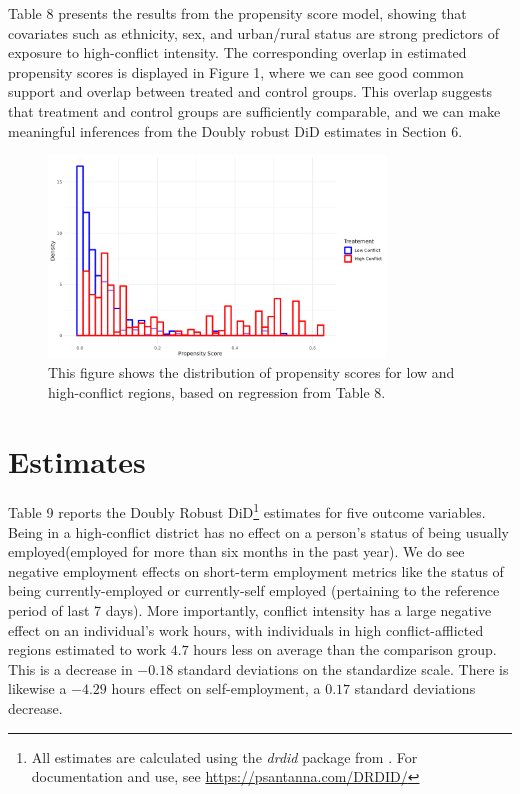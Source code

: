\documentclass[12pt,a4paper]{article}
\begin{document}
Table 8 presents the results from the propensity score model, showing that covariates such as ethnicity, sex, and urban/rural status are strong predictors of exposure to high-conflict intensity. The corresponding overlap in estimated propensity scores is displayed in Figure 1, where we can see good common support and overlap between treated and control groups. This overlap suggests that treatment and control groups are sufficiently comparable, and we can make meaningful inferences from the Doubly robust DiD estimates in Section 6.



\begin{figure}[H]
\centering
\includegraphics[width=0.8\textwidth]{../Analysis files/ps_overlap.jpg}
\caption{This figure shows the distribution of propensity scores for low and high-conflict regions, based on regression from Table 8.}
\label{fig:ps_overlap}
\end{figure}




\section{Estimates}

Table 9 reports the Doubly Robust DiD\footnote{All estimates are calculated using the \textit{drdid} package from \textcite{sant2020doubly}. For documentation and use, see \url{https://psantanna.com/DRDID/}} estimates for five outcome variables.
Being in a high-conflict district has no effect on a person's status of being usually employed(employed for more than six months in the past year). We do see negative employment effects on short-term employment metrics like the status of being currently-employed or currently-self employed (pertaining to the reference period of last 7 days). More importantly, conflict intensity has a large
negative effect on an individual's work hours, with individuals in high conflict-afflicted regions estimated to work $4.7$ hours less on average than the comparison group. This is a decrease in $-0.18$ standard deviations on the standardize scale. There is likewise a $-4.29$ hours effect on self-employment, a $0.17$ standard deviations decrease.
\end{document}
